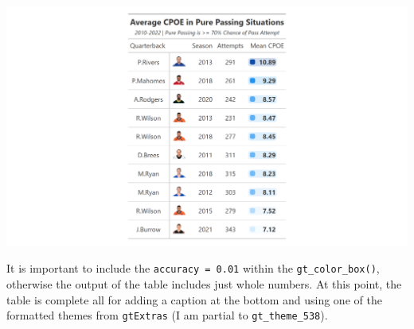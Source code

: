 \documentclass[
  letterpaper,
]{krantz}
\begin{document}
\includegraphics[width=6.61in,height=\textheight]{images/gt_table_4.png}

It is important to include the \texttt{accuracy\ =\ 0.01} within the
\texttt{gt\_color\_box()}, otherwise the output of the table includes
just whole numbers. At this point, the table is complete all for adding
a caption at the bottom and using one of the formatted themes from
\texttt{gtExtras} (I am partial to \texttt{gt\_theme\_538}).
\end{document}
